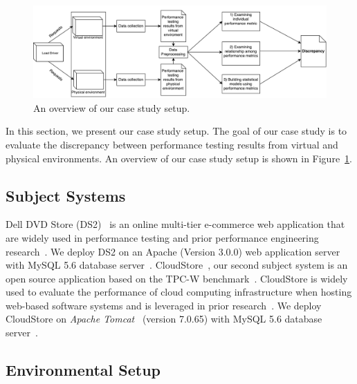 
\begin{figure}[thb]
	\includegraphics[width=.9\textwidth]{figures/overview}
	\caption{An overview of our case study setup.}
	\label{fig:Approach}
\end{figure}

In this section, we present our case study setup. The goal of our case study is to evaluate the discrepancy between performance testing results from virtual and physical environments. An overview of our case study setup is shown in Figure~\ref{fig:Approach}.


\subsection{Subject Systems}
Dell DVD Store (DS2)~\cite{delldvd} is an online multi-tier e-commerce web application that are widely used in performance testing and prior performance engineering research~\cite{Shang:2015:ADP:2668930.2688052,Nguyen:2012:ADP:2188286.2188344, jackicsm2009}. We deploy DS2 on an Apache (Version 3.0.0) web application server with MySQL 5.6 database server~\cite{mysql}. CloudStore~\cite{cloudstore}, our second subject system is an open source application based on the TPC-W benchmark~\cite{tpcw}. CloudStore is widely used to evaluate the performance of cloud computing infrastructure when hosting web-based software systems and is leveraged in prior research~\cite{tarekmsr16}. We deploy CloudStore on \textit{Apache Tomcat}~\cite{tomcat} (version 7.0.65) with MySQL 5.6 database server~\cite{mysql}. 


\subsection{Environmental Setup}

